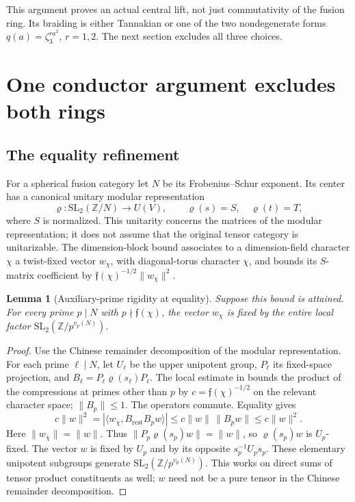 \documentclass[11pt]{article}
\newtheorem{lemma}[theorem]{Lemma}
\newcommand{\Z}{\mathbb Z}
\begin{document}
This argument proves an actual central lift, not just commutativity of
the fusion ring. Its braiding is either Tannakian or one of the two
nondegenerate forms $q(a)=\zeta_3^{ra^2}$, $r=1,2$.
The next section excludes all three choices.

\section{One conductor argument excludes both rings}
\subsection{The equality refinement}
For a spherical fusion category let $N$ be its Frobenius--Schur exponent.
Its center has a canonical unitary modular representation
\[
 \varrho:\mathrm{SL}_2(\Z/N)\longrightarrow U(V),
 \qquad \varrho(s)=S,\quad\varrho(t)=T,
\]
where $S$ is normalized. This unitarity concerns the matrices of the
modular representation; it does not assume that the original tensor
category is unitarizable. The dimension-block bound \cite{Sch26}
associates to a dimension-field character $\chi$ a twist-fixed vector
$w_\chi$, with diagonal-torus character $\chi$, and bounds its
$S$-matrix coefficient by $\mathfrak f(\chi)^{-1/2}\|w_\chi\|^2$.

\begin{lemma}[Auxiliary-prime rigidity at equality]
Suppose this bound is attained. For every prime $p\mid N$ with
$p\nmid\mathfrak f(\chi)$, the vector $w_\chi$ is fixed by the entire
local factor $\mathrm{SL}_2(\Z/p^{v_p(N)})$.
\end{lemma}
\begin{proof}
Use the Chinese remainder decomposition of the modular representation.
For each prime $\ell\mid N$, let $U_\ell$ be the upper unipotent group,
$P_\ell$ its fixed-space projection, and
$B_\ell=P_\ell\varrho(s_\ell)P_\ell$.
The local estimate in \cite[Lemma 4.1]{Sch26} bounds the product of
the compressions at primes other than $p$ by
$c=\mathfrak f(\chi)^{-1/2}$ on the relevant character space;
$\|B_p\|\leq1$. The operators commute. Equality gives
\[
 c\|w\|^2
 =|\langle w_{\bar\chi},B_{\mathrm{rest}}B_pw\rangle|
 \leq c\|w\|\,\|B_pw\|\leq c\|w\|^2.
\]
Here $\|w_{\bar\chi}\|=\|w\|$.
Thus $\|P_p\varrho(s_p)w\|=\|w\|$, so $\varrho(s_p)w$ is
$U_p$-fixed. The vector $w$ is fixed by $U_p$ and by its opposite
$s_p^{-1}U_ps_p$. These elementary unipotent subgroups generate
$\mathrm{SL}_2(\Z/p^{v_p(N)})$. This works on direct sums of tensor
product constituents as well; $w$ need not be a pure tensor in the
Chinese remainder decomposition.
\end{proof}
\end{document}
